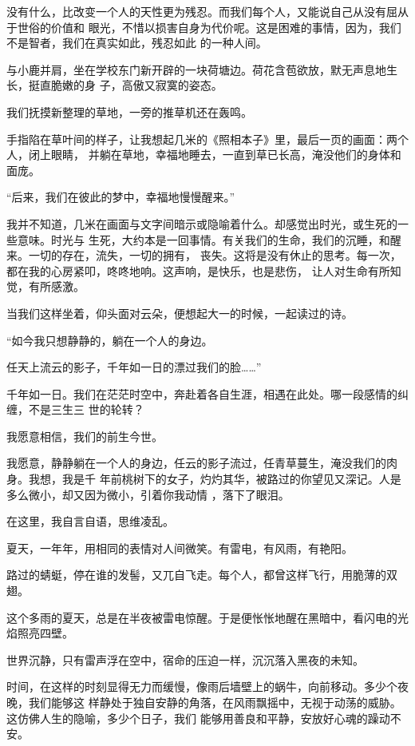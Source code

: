 \documentclass[12pt,a4paper]{article}
\begin{document}
		没有什么，比改变一个人的天性更为残忍。而我们每个人，又能说自己从没有屈从于世俗的价值和
	眼光，不惜以损害自身为代价呢。这是困难的事情，因为，我们不是智者，我们在真实如此，残忍如此
	的一种人间。

		与小鹿并肩，坐在学校东门新开辟的一块荷塘边。荷花含苞欲放，默无声息地生长，挺直脆嫩的身
	子，高傲又寂寞的姿态。

		我们抚摸新整理的草地，一旁的推草机还在轰鸣。

		手指陷在草叶间的样子，让我想起几米的《照相本子》里，最后一页的画面：两个人，闭上眼睛，
	并躺在草地，幸福地睡去，一直到草已长高，淹没他们的身体和面庞。

		“后来，我们在彼此的梦中，幸福地慢慢醒来。”

		我并不知道，几米在画面与文字间暗示或隐喻着什么。却感觉出时光，或生死的一些意味。时光与
	生死，大约本是一回事情。有关我们的生命，我们的沉睡，和醒来。一切的存在，流失，一切的拥有，
	丧失。这将是没有休止的思考。每一次，都在我的心房紧叩，咚咚地响。这声响，是快乐，也是悲伤，
	让人对生命有所知觉，有所感激。

		当我们这样坐着，仰头面对云朵，便想起大一的时候，一起读过的诗。

		“如今我只想静静的，躺在一个人的身边。

		任天上流云的影子，千年如一日的漂过我们的脸……”

		千年如一日。我们在茫茫时空中，奔赴着各自生涯，相遇在此处。哪一段感情的纠缠，不是三生三
	世的轮转？

		我愿意相信，我们的前生今世。

		我愿意，静静躺在一个人的身边，任云的影子流过，任青草蔓生，淹没我们的肉身。我想，我是千
	年前桃树下的女子，灼灼其华，被路过的你望见又深记。人是多么微小，却又因为微小，引着你我动情
	，落下了眼泪。


		在这里，我自言自语，思维凌乱。\par
		夏天，一年年，用相同的表情对人间微笑。有雷电，有风雨，有艳阳。\par
		路过的蜻蜓，停在谁的发髻，又兀自飞走。每个人，都曾这样飞行，用脆薄的双翅。

	\endwriting



		这个多雨的夏天，总是在半夜被雷电惊醒。于是便怅怅地醒在黑暗中，看闪电的光焰照亮四壁。

		世界沉静，只有雷声浮在空中，宿命的压迫一样，沉沉落入黑夜的未知。

		时间，在这样的时刻显得无力而缓慢，像雨后墙壁上的蜗牛，向前移动。多少个夜晚，我们能够这
	样静处于独自安静的角落，在风雨飘摇中，无视于动荡的威胁。这仿佛人生的隐喻，多少个日子，我们
	能够用善良和平静，安放好心魂的躁动不安。
\end{document}
